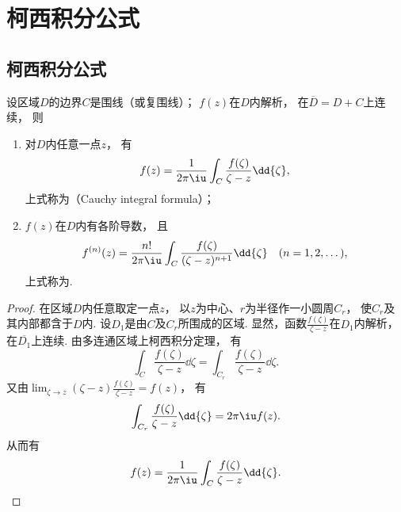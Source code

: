 \section{柯西积分公式}
\subsection{柯西积分公式}
\begin{theorem}\label{theorem:解析函数的积分表示.柯西积分公式}
设区域\(D\)的边界\(C\)是围线（或复围线）；
\(f(z)\)在\(D\)内解析，
在\(\overline{D}=D+C\)上连续，
则\begin{enumerate}
	\item 对\(D\)内任意一点\(z\)，
	有\begin{equation}\label{equation:解析函数的积分表示.柯西积分公式}
		f(z)
		= \frac{1}{2\pi\iu}
		\int_C \frac{f(\zeta)}{\zeta-z} \dd{\zeta},
	\end{equation}
	上式称为（Cauchy integral formula）；

	\item \(f(z)\)在\(D\)内有各阶导数，
	且\begin{equation}\label{equation:解析函数的积分表示.柯西高阶导数公式}
		f^{(n)}(z)
		= \frac{n!}{2\pi\iu}
		\int_C \frac{f(\zeta)}{(\zeta-z)^{n+1}} \dd{\zeta}
		\quad (n=1,2,\dots),
	\end{equation}
	上式称为.
\end{enumerate}
\begin{proof}
在区域\(D\)内任意取定一点\(z\)，
以\(z\)为中心、\(r\)为半径作一小圆周\(C_r\)，
使\(C_r\)及其内部都含于\(D\)内.
设\(D_1\)是由\(C\)及\(C_r\)所围成的区域.
显然，函数\(\frac{f(\zeta)}{\zeta-z}\)在\(D_1\)内解析，
在\(\overline{D_1}\)上连续.
由多连通区域上柯西积分定理，
有\begin{equation*}
	\int_C \frac{f(\zeta)}{\zeta-z} \dd{\zeta}
	= \int_{C_r} \frac{f(\zeta)}{\zeta-z} \dd{\zeta}.
\end{equation*}
又由\(\lim_{\zeta \to z} (\zeta-z) \frac{f(\zeta)}{\zeta-z} = f(z)\)，
有\begin{equation*}
	\int_{C_r} \frac{f(\zeta)}{\zeta-z} \dd{\zeta} = 2\pi\iu f(z).
\end{equation*}
从而有\begin{equation*}
	f(z) = \frac{1}{2\pi\iu} \int_C \frac{f(\zeta)}{\zeta-z} \dd{\zeta}.
\end{equation*}


\end{proof}
\end{theorem}
